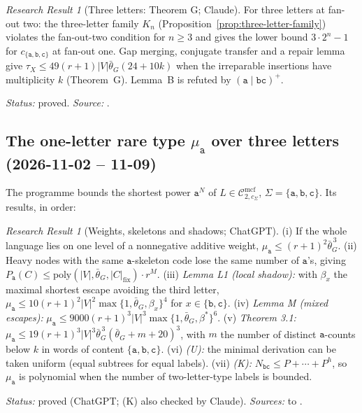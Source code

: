 \documentclass[11pt]{article}
\numberwithin{equation}{section}
\theoremstyle{plain}
\theoremstyle{definition}
\theoremstyle{remark}
\newtheorem{rresult}[theorem]{Research Result}
\newcommand{\Cmcf}[2]{\mathcal{C}^{\mathrm{mcf}}_{#1,#2}}
\theoremstyle{plain}
\begin{document}
\begin{rresult}[Three letters: Theorem G; Claude]
\label{rr:theorem-G}
For three letters at fan-out two: the three-letter family $K_n$
(Proposition~\ref{prop:three-letter-family}) violates the fan-out-two condition for
$n\ge3$ and gives the lower bound $3\cdot2^n-1$ for $c_{\{\mathtt a,\mathtt b,\mathtt c\}}$ at
fan-out one.  Gap merging, conjugate transfer and a repair lemma give
$\tau_X\le49(r+1)|V|\bar\theta_G(24+10k)$ when the irreparable insertions have
multiplicity $k$ (Theorem~G).  Lemma~B is refuted by $(\mathtt a\mid\mathtt{bc})^+$.
\end{rresult}
\noindent\emph{Status:} proved.  \emph{Source:} .

\subsection{The one-letter rare type \texorpdfstring{$\mu_{\mathtt a}$}{mu-a} over three letters (2026-11-02 -- 11-09)}

The programme bounds the shortest power $\mathtt a^N$ of $L\in\Cmcf{2}{c_\Sigma}$,
$\Sigma=\{\mathtt a,\mathtt b,\mathtt c\}$.  Its results, in order:

\begin{rresult}[Weights, skeletons and shadows; ChatGPT]
\label{rr:mu-a-early}
(i) If the whole language lies on one level of a nonnegative additive weight,
$\mu_{\mathtt a}\le(r+1)^2\bar\theta_G^{\,3}$.  (ii) Heavy nodes with the same
$\mathtt a$-skeleton code lose the same number of $\mathtt a$'s, giving
$P_{\mathtt a}(C)\le\mathrm{poly}(|V|,\bar\theta_G,|C|_{\mathrm{fix}})\cdot r^M$.
(iii) \emph{Lemma L1 (local shadow):} with $\beta_x$ the maximal shortest escape
avoiding the third letter, $\mu_{\mathtt a}\le10(r+1)^2|V|^2\max\{1,\bar\theta_G,\beta_x\}^4$
for $x\in\{\mathtt b,\mathtt c\}$.  (iv) \emph{Lemma M (mixed escapes):}
$\mu_{\mathtt a}\le9000(r+1)^3|V|^3\max\{1,\bar\theta_G,\beta^*\}^6$.
(v) \emph{Theorem 3.1:} $\mu_{\mathtt a}\le19(r+1)^3|V|^3\bar\theta_G^{\,3}(\bar\theta_G+m+20)^3$,
with $m$ the number of distinct $\mathtt a$-counts below $k$ in words of content
$\{\mathtt a,\mathtt b,\mathtt c\}$.  (vi) \emph{(U):} the minimal derivation can be
taken uniform (equal subtrees for equal labels).  (vii) \emph{(K):}
$N_{\mathtt{bc}}\le P+\cdots+P^h$, so $\mu_{\mathtt a}$ is polynomial when the number of
two-letter-type labels is bounded.
\end{rresult}
\noindent\emph{Status:} proved (ChatGPT; (K) also checked by Claude).
\emph{Sources:}  to
.
\end{document}

